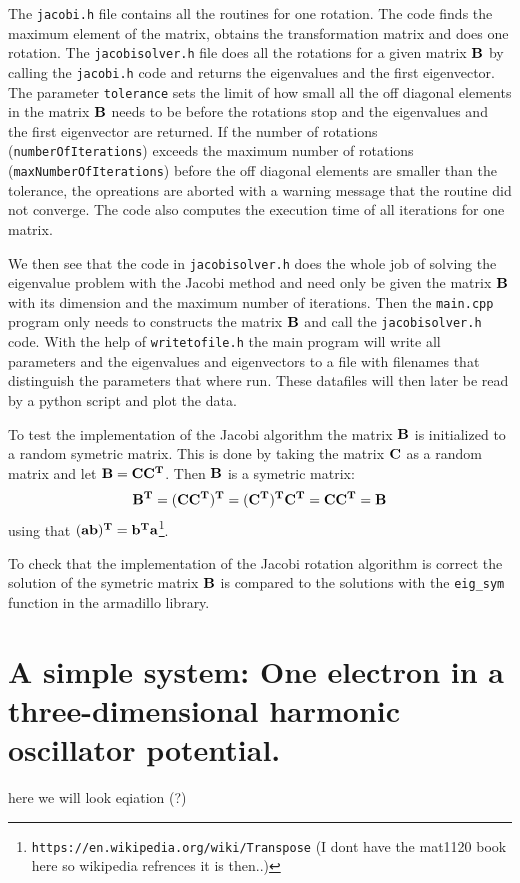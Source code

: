\documentclass[11pt,a4wide]{article}
\begin{document}
The \texttt{jacobi.h} file contains all the routines for one rotation. The code finds the maximum element of the matrix, obtains the transformation matrix and does one rotation. The \texttt{jacobisolver.h} file does all the rotations for a given matrix $\bf B$ by calling the \texttt{jacobi.h} code and returns the eigenvalues and the first eigenvector. The parameter \texttt{tolerance} sets the limit of how small all the off diagonal elements in the matrix $\bf B$ needs to be before the rotations stop and the eigenvalues and the first eigenvector are returned. If the number of rotations (\texttt{numberOfIterations}) exceeds the maximum number of rotations (\texttt{maxNumberOfIterations}) before the off diagonal elements are smaller than the tolerance, the opreations are aborted with a warning message that the routine did not converge. The code also computes the execution time of all iterations for one matrix. 

We then see that the code in \texttt{jacobisolver.h} does the whole job of solving the eigenvalue problem with the Jacobi method and need only be given the matrix $\bf B$ with its dimension and the maximum number of iterations. Then the \texttt{main.cpp} program only needs to constructs the matrix $\bf B$ and call the \texttt{jacobisolver.h} code. With the help of \texttt{writetofile.h} the main program will write all parameters and the eigenvalues and eigenvectors to a file with filenames that distinguish the parameters that where run. These datafiles will then later be read by a python script and plot the data. 

To test the implementation of the Jacobi algorithm the matrix $\bf B$ is initialized to a random symetric matrix. This is done by taking the matrix $\bf C$ as a random matrix and let $\bf B = \bf{CC^T}$. Then $\bf B$ is a symetric matrix:
\[
\bf { B^T = (CC^T)^T = (C^T)^TC^T = CC^T = B}
\]
using that $\bf{ (ab)^T = b^Ta}$\footnote{\texttt{https://en.wikipedia.org/wiki/Transpose} (I dont have the mat1120 book here so wikipedia refrences it is then..)}.

To check that the implementation of the Jacobi rotation algorithm is correct the solution of the symetric matrix $\bf B$ is compared to the solutions with the \texttt{eig\_sym} function in the armadillo library.   

\section{A simple system: One electron in a three-dimensional harmonic oscillator potential.}
here we will look eqiation (?)
\end{document}
